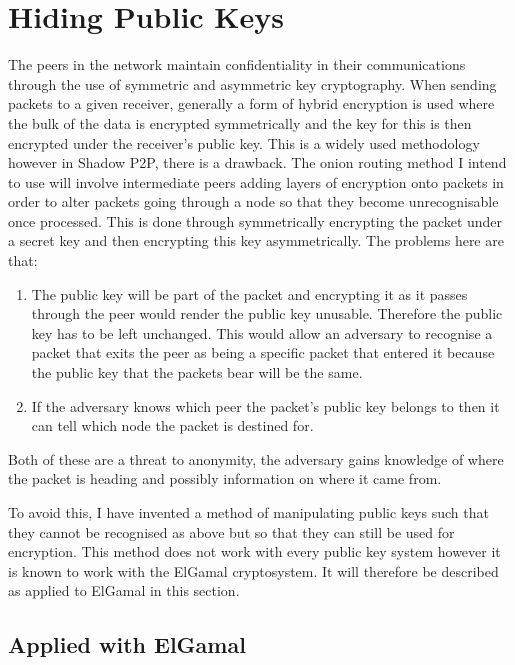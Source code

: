\documentclass[ %
                    author={Luke Murray},
                supervisor={Dr. Simon Hollis},
                     title={Shadow Peer-to-Peer Networks},
                  subtitle={},
                    degree={MEng},
                      year={2013} ]{thesis}
\begin{document}
\section{Hiding Public Keys}

The peers in the network maintain confidentiality in their communications through the use of symmetric and asymmetric key cryptography. When sending packets to a given receiver, generally a form of hybrid encryption is used where the bulk of the data is encrypted symmetrically and the key for this is then encrypted under the receiver's public key. This is a widely used methodology %
however in Shadow P2P, there is a drawback. The onion routing method I intend to use will involve intermediate peers adding layers of encryption onto packets in order to alter packets going through a node so that they become unrecognisable once processed. This is done through symmetrically encrypting the packet under a secret key and then encrypting this key asymmetrically. The problems here are that:
\begin{enumerate}
\item The public key will be part of the packet and encrypting it as it passes through the peer would render the public key unusable. Therefore the public key has to be left unchanged. This would allow an adversary to recognise a packet that exits the peer as being a specific packet that entered it because the public key that the packets bear will be the same.
\item If the adversary knows which peer the packet's public key belongs to then it can tell which node the packet is destined for.
\end{enumerate}
Both of these are a threat to anonymity, the adversary gains knowledge of where the packet is heading and possibly information on where it came from.

To avoid this, I have invented a method of manipulating public keys such that they cannot be recognised as above but so that they can still be used for encryption. This method does not work with every public key system however it is known to work with the ElGamal cryptosystem\cite{elgamal1985public}. It will therefore be described as applied to ElGamal in this section.

\subsection{Applied with ElGamal}
\end{document}
